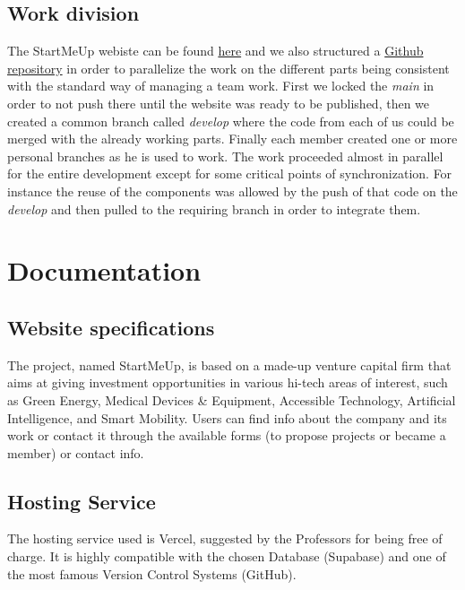 \documentclass[11pt, letterpaper]{article}
\begin{document}
\noindent 
\subsection{Work division}
The StartMeUp webiste can be found \href{https://hypermedia-website.vercel.app/}{here} and we also structured a \href{https://github.com/stefanofossati/hypermedia-website} {Github repository} in order to parallelize the work on the different parts being consistent with the standard way of managing a team work.
First we locked the \emph{main} in order to not push there until the website was ready to be published, then we created a common branch called \emph{develop} where the code from each of us could be merged with the already working parts.
Finally each member created one or more personal branches as he is used to work.
The work proceeded almost in parallel for the entire development except for some critical points of synchronization. For instance the reuse of the components was allowed by the push of that code on the \emph{develop} and then pulled to the requiring branch in order to integrate them. 

\section{Documentation}

\subsection{Website specifications}
The project, named StartMeUp, is based on a made-up venture capital firm that aims at giving investment opportunities in various hi-tech areas of interest, such as Green Energy, Medical Devices \& Equipment, Accessible Technology, Artificial Intelligence, and Smart Mobility.
Users can find info about the company and its work or contact it through the available forms (to propose projects or became a member) or contact info.

\subsection{Hosting Service}
The hosting service used is Vercel, suggested by the Professors for being free of charge.
It is highly compatible with the chosen Database (Supabase) and one of the most famous Version Control Systems (GitHub).
\end{document}
